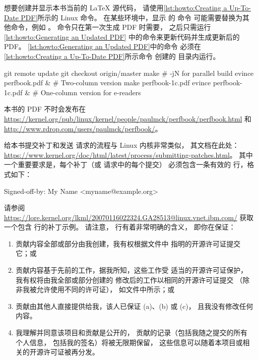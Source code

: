 想要创建并显示本书当前的 \LaTeX{} 源代码，
请使用\cref{lst:howto:Creating a Up-To-Date PDF}所示的
Linux 命令。
在某些环境中，显示  的  命令
可能需要替换为其他命令，例如 。
 命令只在第一次生成 PDF 时需要，
之后只需运行\cref{lst:howto:Generating an Updated PDF}
中的命令来更新代码并生成更新后的 PDF\@。
\cref{lst:howto:Generating an Updated PDF}中的命令
必须在\cref{lst:howto:Creating a Up-To-Date PDF}所示命令
创建的  目录内运行。

\begin{listing}
\begin{VerbatimL}[numbers=none,xleftmargin=0pt]
git remote update
git checkout origin/master
make                     # -jN for parallel build
evince perfbook.pdf &    # Two-column version
make perfbook-1c.pdf
evince perfbook-1c.pdf & # One-column version for e-readers
\end{VerbatimL}
\caption{生成更新后的 PDF}
\label{lst:howto:Generating an Updated PDF}
\end{listing}

本书的 PDF 不时会发布在
\url{https://kernel.org/pub/linux/kernel/people/paulmck/perfbook/perfbook.html}
和
\url{http://www.rdrop.com/users/paulmck/perfbook/}。

给本书提交补丁和发送  请求的流程与 Linux 内核非常类似，
其文档在此处：
\url{https://www.kernel.org/doc/html/latest/process/submitting-patches.html}。
其中一个重要要求是，每个补丁（或  请求中的每个提交）
必须包含一条有效的  行，格式如下：

\begin{VerbatimU}
Signed-off-by: My Name <myname@example.org>
\end{VerbatimU}

请参阅 \url{https://lore.kernel.org/lkml/20070116022324.GA28513@linux.vnet.ibm.com/}
获取一个包含  行的补丁示例。
请注意， 行有着非常明确的含义，
即你在保证：

\begin{enumerate}[label={(\alph*)}]
\item	贡献内容全部或部分由我创建，我有权根据文件中
	指明的开源许可证提交它；或
\item	贡献内容基于先前的工作，据我所知，这些工作受
	适当的开源许可证保护，我有权将由我全部或部分创建的
	修改后的工作以相同的开源许可证提交
	（除非我被允许使用不同的许可证），
	如文件中所示；或
\item	贡献由其他人直接提供给我，该人已保证 (a)、(b) 或 (c)，
	且我没有修改任何内容。
\item	我理解并同意该项目和贡献是公开的，
	贡献的记录（包括我随之提交的所有个人信息，
	包括我的签名）将被无限期保留，
	这些信息可以随着本项目或相关的开源许可证被再分发。
\end{enumerate}

